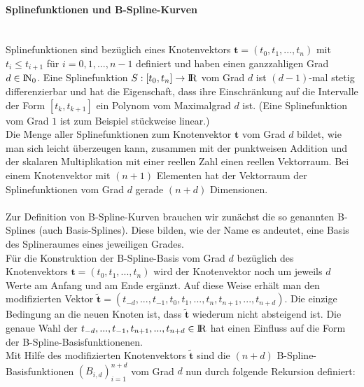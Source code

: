 \paragraph{Splinefunktionen und B-Spline-Kurven}~\\
Splinefunktionen sind bezüglich eines Knotenvektors $\mathbf{t}=(t_0,t_1,...,t_n)$ mit $t_i \le t_{i+1}$ für $i=0,1,...,n-1$ definiert und haben einen ganzzahligen Grad $d\in{\rm I\!N}_0$. Eine Splinefunktion $S:[t_0,t_n]\rightarrow{\rm I\!R}$ vom Grad $d$ ist $(d-1)$-mal stetig differenzierbar und hat die Eigenschaft, dass ihre Einschränkung auf die Intervalle der Form $[t_k,t_{k+1}]$ ein Polynom vom Maximalgrad $d$ ist. (Eine Splinefunktion vom Grad $1$ ist zum Beispiel stückweise linear.)\\
Die Menge aller Splinefunktionen zum Knotenvektor $\mathbf{t}$ vom Grad $d$
bildet, wie man sich leicht überzeugen kann, zusammen mit der punktweisen Addition und der skalaren Multiplikation mit einer reellen Zahl einen reellen Vektorraum. Bei einem Knotenvektor mit $(n+1)$ Elementen hat der Vektorraum der Splinefunktionen vom Grad $d$ gerade $(n+d)$ Dimensionen.\\
\\
Zur Definition von B-Spline-Kurven brauchen wir zunächst die so genannten B-Splines (auch Basis-Splines). Diese bilden, wie der Name es andeutet, eine Basis des Splineraumes eines jeweiligen Grades.\\
Für die Konstruktion der B-Spline-Basis vom Grad $d$ bezüglich des Knotenvektors $\mathbf{t}=(t_0,t_1,...,t_n)$ wird der Knotenvektor noch um jeweils $d$ Werte am Anfang und am Ende ergänzt. Auf diese Weise erhält man den modifizierten Vektor $\mathbf{\tilde{t}}=(t_{-d},...,t_{-1},t_0,t_1,...,t_n,t_{n+1},...,t_{n+d})$. Die einzige Bedingung an die neuen Knoten ist, dass $\mathbf{\tilde{t}}$ wiederum nicht absteigend ist. Die genaue Wahl der $t_{-d},...,t_{-1},t_{n+1},...,t_{n+d}\in{\rm I\!R}$ hat einen Einfluss auf die Form der B-Spline-Basisfunktionenen.\\
Mit Hilfe des modifizierten Knotenvektors $\mathbf{\tilde{t}}$ sind die $(n+d)$ B-Spline-Basisfunktionen $(B_{i,d})_{i=1}^{n+d}$ vom Grad $d$ nun durch folgende Rekursion definiert:

